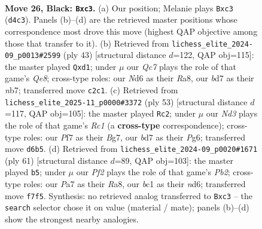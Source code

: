 \documentclass[11pt]{article}
\begin{document}
\clearpage

\begin{figure}[p]\centering
\begin{subfigure}{0.46\textwidth}\centering
\resizebox{\linewidth}{!}{%
\newchessgame
\chessboard[
  setfen={r1b5/pppB1ppk/3n3p/3P4/3b3Q/2N2P1P/PPq3P1/R1B2K2 b - - 0 26},
  showmover=false,
  pgfstyle=straightmove, color=movearrow, markmove={d4-c3}
]}
\caption{}
\end{subfigure}\hfill
\begin{subfigure}{0.46\textwidth}\centering
\resizebox{\linewidth}{!}{%
\newchessgame
\chessboard[
  setfen={r1b3k1/pN2bppp/4pn2/8/2Q5/1R4P1/P3PP1P/3NqBK1 b - - 2 22},
  showmover=false,
  pgfstyle=straightmove, color=movearrow, markmove={e1-d1}
]}
\caption{}
\end{subfigure}
\\[4pt]
\begin{subfigure}{0.46\textwidth}\centering
\resizebox{\linewidth}{!}{%
\newchessgame
\chessboard[
  setfen={2r3k1/5pb1/6pp/Qb2pP2/4PnPq/BP1p2NP/P4RBK/8 b - - 2 27},
  showmover=false,
  pgfstyle=straightmove, color=movearrow, markmove={c8-c2}
]}
\caption{}
\end{subfigure}\hfill
\begin{subfigure}{0.46\textwidth}\centering
\resizebox{\linewidth}{!}{%
\newchessgame
\chessboard[
  setfen={r2n2k1/pp4p1/2pNbp1p/2q1pB2/2P4Q/3R2P1/P4P1P/6K1 b - - 1 31},
  showmover=false,
  pgfstyle=straightmove, color=movearrow, markmove={b7-b5}
]}
\caption{}
\end{subfigure}
\caption{\textbf{Move 26, Black: \texttt{Bxc3}.} (a) Our position; Melanie plays \texttt{Bxc3} (\texttt{d4c3}). Panels (b)--(d) are the retrieved master positions whose correspondence most drove this move (highest QAP objective among those that transfer to it). (b) Retrieved from \texttt{lichess\_elite\_2024-09\_p0013\#2599} (ply 43) [structural distance $d$=122, QAP obj=115]: the master played \texttt{Qxd1}; under $\mu$ our \emph{Qc7} plays the role of that game's \emph{Qe8}; cross-type roles: our \emph{N}d6 as their \emph{R}a8, our \emph{b}d7 as their \emph{n}b7; transferred move \texttt{c2c1}. (c) Retrieved from \texttt{lichess\_elite\_2025-11\_p0000\#3372} (ply 53) [structural distance $d$=117, QAP obj=105]: the master played \texttt{Rc2}; under $\mu$ our \emph{Nd3} plays the role of that game's \emph{Rc1} (a \textbf{cross-type} correspondence); cross-type roles: our \emph{P}f7 as their \emph{B}g7, our \emph{b}d7 as their \emph{P}g6; transferred move \texttt{d6b5}. (d) Retrieved from \texttt{lichess\_elite\_2024-09\_p0020\#1671} (ply 61) [structural distance $d$=89, QAP obj=103]: the master played \texttt{b5}; under $\mu$ our \emph{Pf2} plays the role of that game's \emph{Pb2}; cross-type roles: our \emph{P}a7 as their \emph{R}a8, our \emph{b}c1 as their \emph{n}d6; transferred move \texttt{f7f5}. Synthesis: no retrieved analog transferred to \texttt{Bxc3} -- the \texttt{search} selector chose it on value (material / mate); panels (b)--(d) show the strongest nearby analogies.}
\label{fig:thought-m51}
\end{figure}
\end{document}
